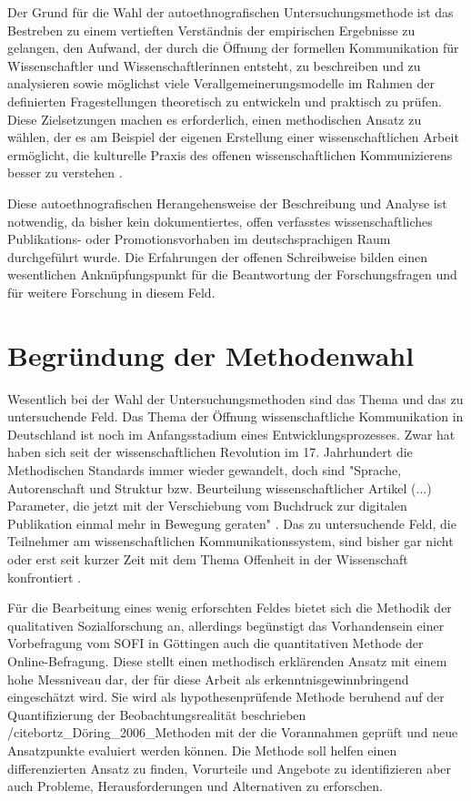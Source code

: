 Der Grund für die Wahl der autoethnografischen Untersuchungsmethode ist das Bestreben zu einem vertieften Verständnis der empirischen Ergebnisse zu gelangen, den Aufwand, der durch die Öffnung der formellen Kommunikation für Wissenschaftler und Wissenschaftlerinnen entsteht, zu beschreiben und zu analysieren sowie möglichst viele Verallgemeinerungsmodelle im Rahmen der definierten Fragestellungen theoretisch zu entwickeln und praktisch zu prüfen. Diese Zielsetzungen machen es erforderlich, einen methodischen Ansatz zu wählen, der es am Beispiel der eigenen Erstellung einer wissenschaftlichen Arbeit ermöglicht, die kulturelle Praxis des offenen wissenschaftlichen Kommunizierens besser zu verstehen \cite{maso_2001_phenomenology}.

Diese autoethnografischen Herangehensweise der Beschreibung und Analyse ist notwendig, da bisher kein dokumentiertes, offen verfasstes wissenschaftliches Publikations- oder Promotionsvorhaben im deutschsprachigen Raum durchgeführt wurde. Die Erfahrungen der offenen Schreibweise bilden einen wesentlichen Anknüpfungspunkt für die Beantwortung der Forschungsfragen und für weitere Forschung in diesem Feld.

\section{Begründung der Methodenwahl}

Wesentlich bei der Wahl der Untersuchungsmethoden sind das Thema und das zu untersuchende Feld. Das Thema der Öffnung wissenschaftliche Kommunikation in Deutschland ist noch im Anfangsstadium eines Entwicklungsprozesses. Zwar hat haben sich seit der wissenschaftlichen Revolution im 17. Jahrhundert die Methodischen Standards immer wieder gewandelt, doch sind "Sprache, Autorenschaft und Struktur bzw. Beurteilung wissenschaftlicher Artikel (...) Parameter, die jetzt mit der Verschiebung vom Buchdruck zur digitalen Publikation einmal mehr in Bewegung geraten" \cite{hagner_2015_sache_buches}. Das zu untersuchende Feld, die Teilnehmer am wissenschaftlichen Kommunikationssystem, sind bisher gar nicht oder erst seit kurzer Zeit mit dem Thema Offenheit in der Wissenschaft konfrontiert \cite{hagner_2015_sache_buches}.

Für die Bearbeitung eines wenig erforschten Feldes bietet sich die Methodik der qualitativen Sozialforschung an, allerdings begünstigt das Vorhandensein einer Vorbefragung vom SOFI in Göttingen auch die quantitativen Methode der Online-Befragung. Diese stellt einen methodisch erklärenden Ansatz mit einem hohe Messniveau dar, der für diese Arbeit als erkenntnisgewinnbringend eingeschätzt wird. Sie wird als hypothesenprüfende Methode beruhend auf der Quantifizierung der Beobachtungsrealität beschrieben /cite{bortz_Döring_2006_Methoden} mit der die Vorannahmen geprüft und neue Ansatzpunkte evaluiert werden können. Die Methode soll helfen einen differenzierten Ansatz zu finden, Vorurteile und Angebote zu identifizieren aber auch Probleme, Herausforderungen und Alternativen zu erforschen.

